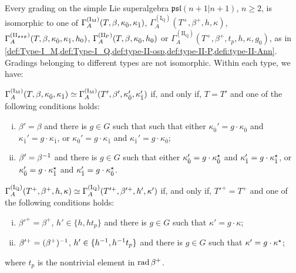 \begin{thm}\label{thm:final-A(n-n)}
    Every grading on the simple Lie superalgebra ${\mathfrak{psl}(n+1 | n+1)}$, $n\geq 2$, is isomorphic to one of 
    $\Gamma^{\mathrm{(I_M)}}_A(T, \beta, \kappa_{\bar{0}}, \kappa_{\bar{1}})$, $\Gamma^{\mathrm{(I_Q)}}_A(T^+, \beta^+, h, \kappa)$, $\Gamma^{\mathrm{(II_{\mathfrak{osp}})}}_A(T, \beta, \kappa_{\bar{0}}, \kappa_{\bar{1}}, h_0)$, $\Gamma_A^{\mathrm{(II_P)}}(T, \beta, \kappa_{\bar{0}}, h_0)$ or $\Gamma_A^{\mathrm{(II_Q)}}(T^+, \beta^+, t_p, h, \kappa, g_0)$, as in \cref{def:Type-I_M,def:Type-I_Q,def:type-II-osp,def:type-II-P,defi:type-II-Ann}. 
    Gradings belonging to different types are not isomorphic. 
    Within each type, we have:
    
    \noindent{}
        
        \noindent$\Gamma^{\mathrm{(I_M)}}_A(T, \beta, \kappa_{\bar{0}}, \kappa_{\bar{1}}) 
        \simeq 
        \Gamma^{\mathrm{(I_M)}}_A(T', \beta', \kappa_{\bar{0}}', \kappa_{\bar{1}}')$ if, and only if, $T = T'$ and one of the following conditions holds:
	\begin{enumerate}[(i)]
	    \item $\beta'=\beta$ and there is $g\in G$ such that such that either $\kappa_{\bar 0}'=g \cdot \kappa_{\bar 0}$ and $\kappa_{\bar 1}'=g \cdot \kappa_{\bar 1}$, or $\kappa_{\bar 0}'=g \cdot \kappa_{\bar 1}$ and $\kappa_{\bar 1}'=g \cdot \kappa_{\bar 0}$; 
	    \item $\beta'=\beta^{-1}$ and there is $g\in G$ such that either $\kappa_{\bar 0}'=g \cdot \kappa_{\bar 0}^\star$ and $\kappa_{\bar 1}'=g \cdot \kappa_{\bar 1}^\star$, or $\kappa_{\bar 0}'=g \cdot \kappa_{\bar 1}^\star$ and $\kappa_{\bar 1}'=g \cdot \kappa_{\bar 0}^\star$. 
	\end{enumerate}
       
    \noindent{}
    
        \noindent $\Gamma^{\mathrm{(I_Q)}}_A(T^+, \beta^+, h, \kappa)
        \simeq    \Gamma^{\mathrm{(I_Q)}}_A(T'^+, \beta'^+, h', \kappa')$ if, and only if, $T'^+ = T^+$ and one of the following conditions holds:
    \begin{enumerate}[(i)]
	    \item $\beta'^+=\beta^+$, $h' \in \{ h, h t_p \}$ and there is $g\in G$ such that $\kappa' = g \cdot \kappa$;
	    \item $\beta'^+= (\beta^+)^{-1}$, $h' \in \{ h^{-1}, h^{-1} t_p \}$ and there is $g\in G$ such that $\kappa' = g \cdot \kappa^\star$; 
	\end{enumerate}
	where $t_p$ is the nontrivial element in $\operatorname{rad} \beta^+$. 
        

\end{thm}
